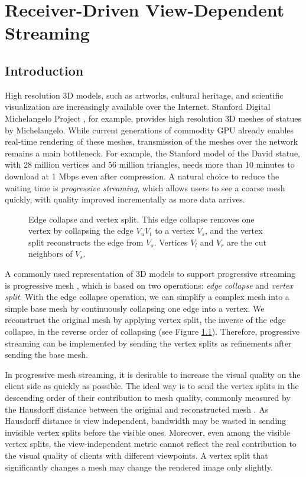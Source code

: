 \chapter{Receiver-Driven View-Dependent Streaming}
\label{c:rdstream}
\section{Introduction}
\label{s:dstream:intro}
    High resolution 3D models, such as artworks,
    cultural heritage, and scientific visualization are increasingly available over 
    the Internet. Stanford Digital Michelangelo Project \cite{levoy00digital},
    for example, provides high resolution 3D meshes of statues by Michelangelo.
    While current generations of commodity GPU already enables real-time rendering of these meshes, transmission of the meshes over the network remains
    a main bottleneck. For example, the Stanford model of the David statue, with 28 million vertices
    and 56 million triangles, needs more than 10 minutes to download at 1 Mbps
    even after compression. A natural choice to reduce the waiting time 
    is \emph{progressive streaming}, which allows
    users to see a coarse mesh quickly, with quality improved incrementally as
    more data arrives.

    \begin{figure}
    \centering
    \caption{Edge collapse and vertex split.
    This edge collapse removes one vertex by collapsing the edge $V_uV_t$ to a vertex $V_s$, and the
    vertex split reconstructs the edge from $V_s$. Vertices $V_l$ and $V_r$ are
    the cut neighbors of $V_s$.\label{dstream:split}}
    \end{figure}
    A commonly used representation of 3D models to support progressive streaming is
    progressive mesh \cite{237216}, which is based on two operations: 
    \emph{edge collapse} and \emph{vertex split}. 
    With the edge collapse operation,
    we can simplify a complex mesh into a simple base mesh
    by continuously collapsing one edge into
    a vertex. We reconstruct the original mesh
    by applying vertex split, the inverse of the edge collapse, in the
    reverse order of collapsing (see Figure \ref{dstream:split}). Therefore,
    progressive streaming can be implemented by sending the vertex
    splits as refinements after sending the base mesh.

    In progressive mesh streaming, it is desirable to increase the visual quality
    on the client side as quickly as possible.
    The ideal way is to send the vertex splits
    in the descending order of their contribution to
    mesh quality, commonly measured by the Hausdorff distance between
    the original and reconstructed mesh \cite{cignoni98metro}.
    As Hausdorff distance is view independent, 
    bandwidth may be wasted in sending invisible vertex splits
    before the visible ones. Moreover, even among the visible vertex splits,
    the view-independent metric cannot 
    reflect the real contribution to the visual quality of
    clients with different viewpoints. A vertex split that significantly
    changes a mesh may change the rendered image 
    only slightly.

